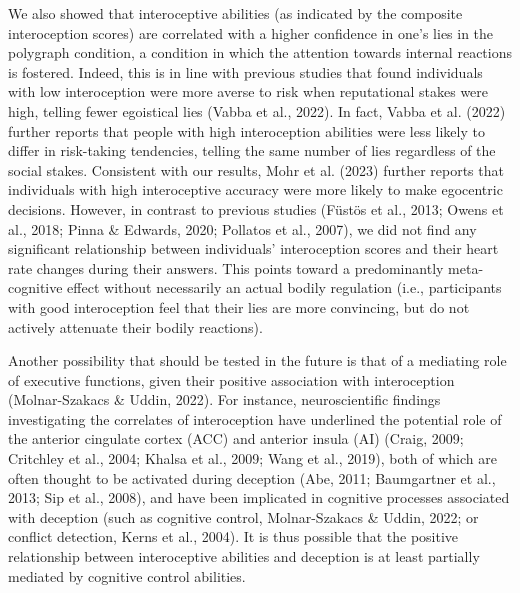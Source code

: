 \documentclass[
  man,mask,floatsintext]{apa6}
\begin{document}
We also showed that interoceptive abilities (as indicated by the composite interoception scores) are correlated with a higher confidence in one's lies in the polygraph condition, a condition in which the attention towards internal reactions is fostered. Indeed, this is in line with previous studies that found individuals with low interoception were more averse to risk when reputational stakes were high, telling fewer egoistical lies (Vabba et al., 2022). In fact, Vabba et al. (2022) further reports that people with high interoception abilities were less likely to differ in risk-taking tendencies, telling the same number of lies regardless of the social stakes. Consistent with our results, Mohr et al. (2023) further reports that individuals with high interoceptive accuracy were more likely to make egocentric decisions. However, in contrast to previous studies (Füstös et al., 2013; Owens et al., 2018; Pinna \& Edwards, 2020; Pollatos et al., 2007), we did not find any significant relationship between individuals' interoception scores and their heart rate changes during their answers. This points toward a predominantly meta-cognitive effect without necessarily an actual bodily regulation (i.e., participants with good interoception feel that their lies are more convincing, but do not actively attenuate their bodily reactions).

Another possibility that should be tested in the future is that of a mediating role of executive functions, given their positive association with interoception (Molnar-Szakacs \& Uddin, 2022). For instance, neuroscientific findings investigating the correlates of interoception have underlined the potential role of the anterior cingulate cortex (ACC) and anterior insula (AI) (Craig, 2009; Critchley et al., 2004; Khalsa et al., 2009; Wang et al., 2019), both of which are often thought to be activated during deception (Abe, 2011; Baumgartner et al., 2013; Sip et al., 2008), and have been implicated in cognitive processes associated with deception (such as cognitive control, Molnar-Szakacs \& Uddin, 2022; or conflict detection, Kerns et al., 2004). It is thus possible that the positive relationship between interoceptive abilities and deception is at least partially mediated by cognitive control abilities.
\end{document}
